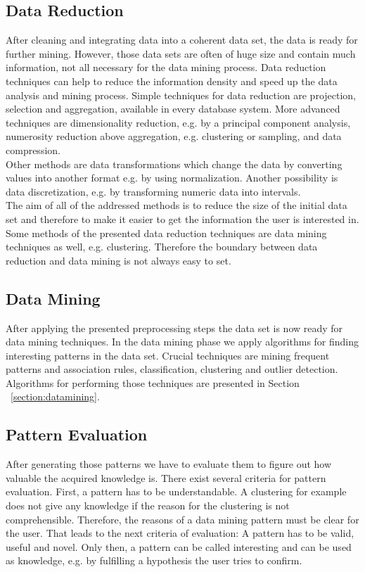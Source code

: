 \subsection{Data Reduction}

After cleaning and integrating data into a coherent data set, the data is ready for further mining. However, those data sets are often of huge size and contain much information, not all necessary for the data mining process. Data reduction techniques can help to reduce the information density and speed up the data analysis and mining process. Simple techniques for data reduction are projection, selection and aggregation, available in every database system. More advanced techniques are dimensionality reduction, e.g. by a principal component analysis, numerosity reduction above aggregation, e.g. clustering or sampling, and data compression. 
\\
Other methods are data transformations which change the data by converting values into another format e.g. by using normalization. Another possibility is data discretization, e.g. by transforming numeric data into intervals. 
\\
The aim of all of the addressed methods is to reduce the size of the initial data set and therefore to make it easier to get the information the user is interested in. Some methods of the presented data reduction techniques are data mining techniques as well, e.g. clustering. Therefore the boundary between data reduction and data mining is not always easy to set.


\subsection{Data Mining}

After applying the presented preprocessing steps the data set is now ready for data mining techniques. In the data mining phase we apply algorithms for finding interesting patterns in the data set. Crucial techniques are mining frequent patterns and association rules, classification, clustering and outlier detection. Algorithms for performing those techniques are presented in Section ~\ref{section:datamining}. 


\subsection{Pattern Evaluation}

After generating those patterns we have to evaluate them to figure out how valuable the acquired knowledge is. There exist several criteria for pattern evaluation. First, a pattern has to be understandable. A clustering for example does not give any knowledge if the reason for the clustering is not comprehensible. Therefore, the reasons of a data mining pattern must be clear for the user. That leads to the next criteria of evaluation: A pattern has to be valid, useful and novel. Only then, a pattern can be called interesting and can be used as knowledge, e.g. by fulfilling a hypothesis the user tries to confirm. 


